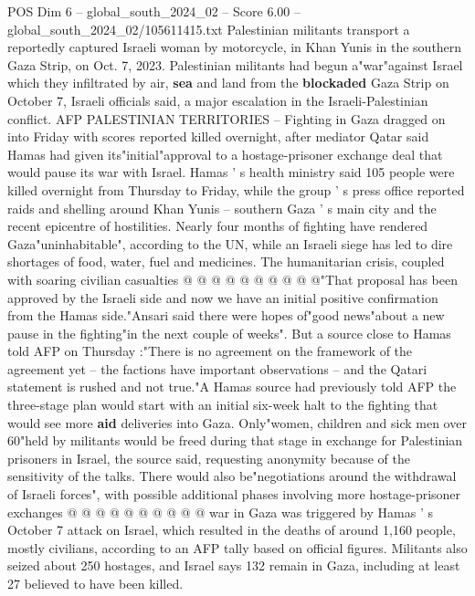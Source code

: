 \begin{textsample}{POS Dim 6 – global\_south\_2024\_02 – Score 6.00 – global\_south\_2024\_02/105611415.txt}  \label{ex:f6_pos_161}
Palestinian militants transport a reportedly captured Israeli woman by motorcycle, in Khan Yunis in the southern Gaza Strip, on Oct. 7, 2023.
Palestinian militants had begun a"war"against Israel which they infiltrated by air, \textbf{sea} and land from the \textbf{blockaded} Gaza Strip on October 7, Israeli officials said, a major escalation in the Israeli-Palestinian conflict.
AFP PALESTINIAN TERRITORIES -- Fighting in Gaza dragged on into Friday with scores reported killed overnight, after mediator Qatar said Hamas had given its"initial"approval to a hostage-prisoner exchange deal that would pause its war with Israel.
Hamas ' s health ministry said 105 people were killed overnight from Thursday to Friday, while the group ' s press office reported raids and shelling around Khan Yunis -- southern Gaza ' s main city and the recent epicentre of hostilities.
Nearly four months of fighting have rendered Gaza"uninhabitable", according to the UN, while an Israeli siege has led to dire shortages of food, water, fuel and medicines.
The humanitarian crisis, coupled with soaring civilian casualties @ @ @ @ @ @ @ @ @ @"That proposal has been approved by the Israeli side and now we have an initial positive confirmation from the Hamas side."Ansari said there were hopes of"good news"about a new pause in the fighting"in the next couple of weeks".
But a source close to Hamas told AFP on Thursday :"There is no agreement on the framework of the agreement yet -- the factions have important observations -- and the Qatari statement is rushed and not true."A Hamas source had previously told AFP the three-stage plan would start with an initial six-week halt to the fighting that would see more \textbf{aid} deliveries into Gaza.
Only"women, children and sick men over 60"held by militants would be freed during that stage in exchange for Palestinian prisoners in Israel, the source said, requesting anonymity because of the sensitivity of the talks.
There would also be"negotiations around the withdrawal of Israeli forces", with possible additional phases involving more hostage-prisoner exchanges @ @ @ @ @ @ @ @ @ @ war in Gaza was triggered by Hamas ' s October 7 attack on Israel, which resulted in the deaths of around 1,160 people, mostly civilians, according to an AFP tally based on official figures.
Militants also seized about 250 hostages, and Israel says 132 remain in Gaza, including at least 27 believed to have been killed.

\end{textsample}

